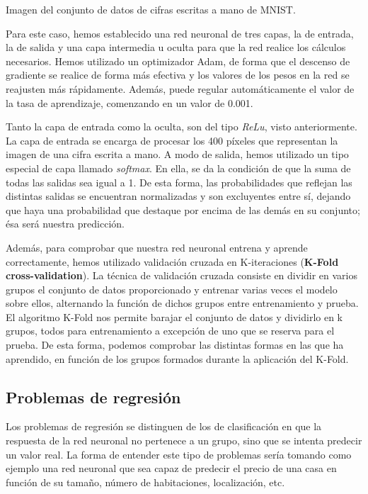 %
       {Imagen del conjunto de datos de cifras escritas a mano de MNIST.} 

Para este caso, hemos establecido una red neuronal de tres capas, la de entrada, la de salida y una capa intermedia u oculta para que la red realice los cálculos necesarios. Hemos utilizado un optimizador Adam, de forma que el descenso de gradiente se realice de forma más efectiva y los valores de los pesos en la red se reajusten más rápidamente. Además, puede regular automáticamente el valor de la tasa de aprendizaje, comenzando en un valor de 0.001.

Tanto la capa de entrada como la oculta, son del tipo \textit{ReLu}, visto anteriormente. La capa de entrada se encarga de procesar los 400 píxeles que representan la imagen de una cifra escrita a mano. A modo de salida, hemos utilizado un tipo especial de capa llamado \textit{softmax}. En ella, se da la condición de que la suma de todas las salidas sea igual a 1. De esta forma, las probabilidades que reflejan las distintas salidas se encuentran normalizadas y son excluyentes entre sí, dejando que haya una probabilidad que destaque por encima de las demás en su conjunto; ésa será nuestra predicción. 

Además, para comprobar que nuestra red neuronal entrena y aprende correctamente, hemos utilizado validación cruzada en K-iteraciones (\textbf{K-Fold cross-validation}). La técnica de validación cruzada consiste en dividir en varios grupos el conjunto de datos proporcionado y entrenar varias veces el modelo sobre ellos, alternando la función de dichos grupos entre entrenamiento y prueba. El algoritmo K-Fold nos permite barajar el conjunto de datos y dividirlo en k grupos, todos para entrenamiento a excepción de uno que se reserva para el prueba. De esta forma, podemos comprobar las distintas formas en las que ha aprendido, en función de los grupos formados durante la aplicación del K-Fold.

\subsection{Problemas de regresión}
Los problemas de regresión se distinguen de los de clasificación en que la respuesta de la red neuronal no pertenece a un grupo, sino que se intenta predecir un valor real. La forma de entender este tipo de problemas sería tomando como ejemplo una red neuronal que sea capaz de predecir el precio de una casa en función de su tamaño, número de habitaciones, localización, etc.

